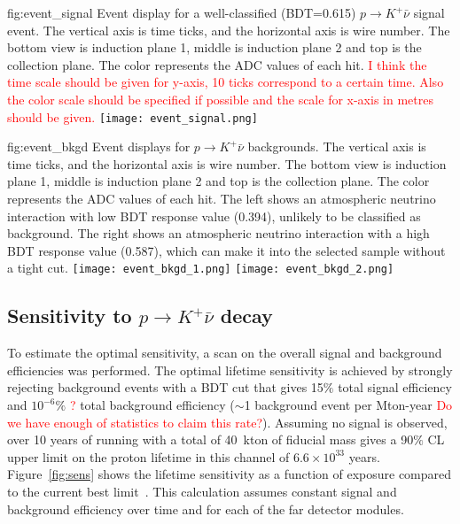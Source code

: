 \begin{dunefigure}
{fig:event_signal}
{Event display for a well-classified (BDT=0.615) $p\rightarrow K^{+} \bar{\nu}$ signal event.  The vertical axis is time ticks, and the horizontal axis is wire number. The bottom view is induction plane 1, middle is induction plane 2 and top is the collection plane. The color represents the ADC values of each hit. \textcolor{red}{I think the time scale should be given for y-axis, 10 ticks correspond to a certain time. Also the color scale should be specified if possible and the scale for x-axis in metres should be given.}}
\texttt{[image: event\_signal.png]}
\end{dunefigure} 

\begin{dunefigure}
{fig:event_bkgd}
{Event displays for $p\rightarrow K^{+} \bar{\nu}$ backgrounds.  The vertical axis is time ticks, and the horizontal axis is wire number. The bottom view is induction plane 1, middle is induction plane 2 and top is the collection plane. The color represents the ADC values of each hit. The left shows an atmospheric neutrino interaction with low BDT response value (0.394), unlikely to be classified as background. The right shows an atmospheric neutrino interaction with a high BDT response value (0.587), which can make it into the selected sample without a tight cut.}
\texttt{[image: event\_bkgd\_1.png]}
\texttt{[image: event\_bkgd\_2.png]}
\end{dunefigure}

\subsection{Sensitivity to $p\to K^+\bar{\nu}$ decay}
\label{subsec:nonaccel-ndk-nubarkplus}

To estimate the optimal sensitivity, a scan on the overall signal and background efficiencies was performed.  The optimal lifetime sensitivity is achieved by strongly rejecting background events with a BDT cut that gives 15$\%$ total signal efficiency and $10^{-6}\%$ \textcolor{red}{?} total background efficiency ($\sim$1 background event per Mton-year \textcolor{red}{Do we have enough of statistics to claim this rate?}). Assuming no signal is observed, over 10 years of running with a total of 40~kton of fiducial mass gives a 90$\%$ CL upper limit on the proton lifetime in this channel of $6.6\times10^{33}$ years. Figure~\ref{fig:sens} shows the lifetime sensitivity as a function of exposure compared to the current best limit~\cite{Abe:2014mwa}. This calculation assumes constant signal and background efficiency over time and for each of the far detector modules.

